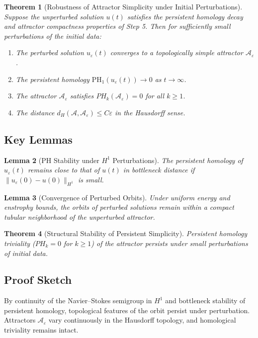 \documentclass[11pt]{article}
\newtheorem{theorem}{Theorem}[section]
\newtheorem{lemma}[theorem]{Lemma}
\theoremstyle{definition}
\begin{document}
\begin{theorem}[Robustness of Attractor Simplicity under Initial Perturbations]
\label{thm:perturb_stability}
Suppose the unperturbed solution $u(t)$ satisfies the persistent homology decay and attractor compactness properties of Step 5. Then for sufficiently small perturbations of the initial data:
\begin{enumerate}
  \item The perturbed solution $u_\varepsilon(t)$ converges to a topologically simple attractor $\mathcal{A}_\varepsilon$.
  \item The persistent homology $\mathrm{PH}_1(u_\varepsilon(t)) \to 0$ as $t \to \infty$.
  \item The attractor $\mathcal{A}_\varepsilon$ satisfies $PH_k(\mathcal{A}_\varepsilon) = 0$ for all $k \ge 1$.
  \item The distance $d_H(\mathcal{A}, \mathcal{A}_\varepsilon) \leq C\varepsilon$ in the Hausdorff sense.
\end{enumerate}
\end{theorem}

\subsection*{Key Lemmas}

\begin{lemma}[PH Stability under $H^1$ Perturbations]
The persistent homology of $u_\varepsilon(t)$ remains close to that of $u(t)$ in bottleneck distance if $\|u_\varepsilon(0) - u(0)\|_{H^1}$ is small.
\end{lemma}

\begin{lemma}[Convergence of Perturbed Orbits]
Under uniform energy and enstrophy bounds, the orbits of perturbed solutions remain within a compact tubular neighborhood of the unperturbed attractor.
\end{lemma}

\begin{theorem}[Structural Stability of Persistent Simplicity]
Persistent homology triviality ($PH_k = 0$ for $k \ge 1$) of the attractor persists under small perturbations of initial data.
\end{theorem}

\subsection*{Proof Sketch}
By continuity of the Navier--Stokes semigroup in $H^1$ and bottleneck stability of persistent homology, topological features of the orbit persist under perturbation. Attractors $\mathcal{A}_\varepsilon$ vary continuously in the Hausdorff topology, and homological triviality remains intact.
\end{document}
